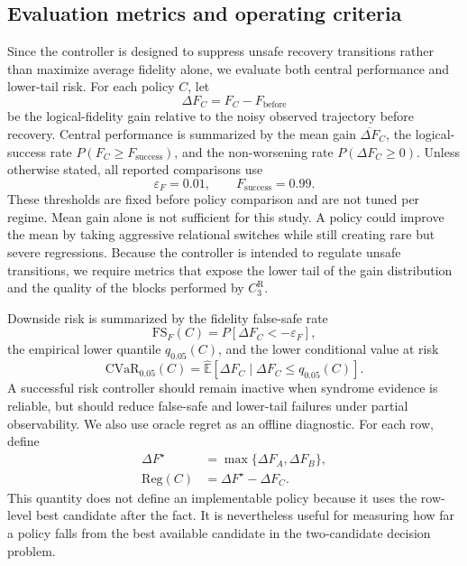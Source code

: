 \documentclass{iopjournal}
\begin{document}
\subsection{Evaluation metrics and operating criteria}\label{subsec:evaluation-metrics}

Since the controller is designed to suppress unsafe recovery transitions rather than
maximize average fidelity alone, we evaluate both central performance and
lower-tail risk. For each policy $C$, let
\begin{equation}
\Delta F_C=F_C-F_{\mathrm{before}}
\end{equation}
be the logical-fidelity gain relative to the noisy observed trajectory before
recovery. Central performance is summarized by the mean gain
$\overline{\Delta F}_C$, the logical-success rate
$P(F_C\ge F_{\mathrm{success}})$, and the non-worsening rate
$P(\Delta F_C\ge0)$.
Unless otherwise stated, all reported comparisons use
\begin{equation}
\varepsilon_F=0.01,\qquad F_{\mathrm{success}}=0.99.
\end{equation}
These thresholds are fixed before policy comparison and are not tuned per regime.
Mean gain alone is not sufficient for this study. A policy could improve the mean
by taking aggressive relational switches while still creating rare but severe
regressions. Because the controller is intended to regulate unsafe transitions, we
require metrics that expose the lower tail of the gain distribution and the
quality of the blocks performed by $C_3^{\mathrm R}$.

Downside risk is summarized by the fidelity false-safe rate
\begin{equation}
\mathrm{FS}_F(C)
=
P\!\left[\Delta F_C<-\varepsilon_F\right],
\end{equation}
the empirical lower quantile $q_{0.05}(C)$, and the lower conditional value at risk
\begin{equation}
\mathrm{CVaR}_{0.05}(C)
=
\widehat{\mathbb{E}}
\left[
\Delta F_C\mid \Delta F_C\le q_{0.05}(C)
\right].
\end{equation}
A successful risk controller should remain inactive when syndrome evidence is
reliable, but should reduce false-safe and lower-tail failures under partial
observability.
We also use oracle regret as an offline diagnostic. For each row, define
\begin{equation}
\begin{aligned}
\Delta F^\star
&=
\max\{\Delta F_A,\Delta F_B\},\\
\mathrm{Reg}(C)
&=
\Delta F^\star-\Delta F_C.
\end{aligned}
\end{equation}
This quantity does not define an implementable policy because it uses the
row-level best candidate after the fact. It is nevertheless useful for measuring
how far a policy falls from the best available candidate in the two-candidate
decision problem.
\end{document}
